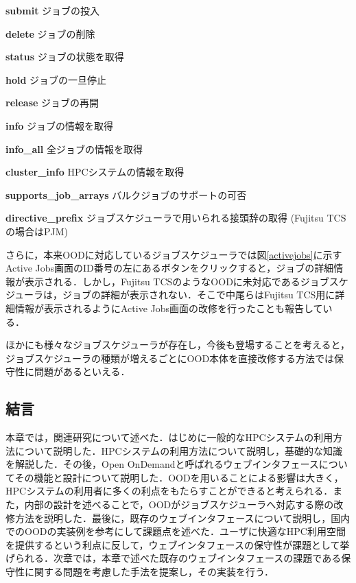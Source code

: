 \textbf{submit} ジョブの投入\par
\textbf{delete} ジョブの削除\par
\textbf{status} ジョブの状態を取得\par
\textbf{hold} ジョブの一旦停止\par
\textbf{release} ジョブの再開\par
\textbf{info} ジョブの情報を取得\par
\textbf{info\_all} 全ジョブの情報を取得\par
\textbf{cluster\_info} HPCシステムの情報を取得\par
\textbf{supports\_job\_arrays} バルクジョブのサポートの可否\par
\textbf{directive\_prefix} ジョブスケジューラで用いられる接頭辞の取得 (Fujitsu TCSの場合はPJM)\par

さらに，本来OODに対応しているジョブスケジューラでは図\ref{activejobs}に示すActive Jobs画面のID番号の左にあるボタンをクリックすると，ジョブの詳細情報が表示される．しかし，Fujitsu TCSのようなOODに未対応であるジョブスケジューラは，ジョブの詳細が表示されない．そこで中尾らはFujitsu TCS用に詳細情報が表示されるようにActive Jobs画面の改修を行ったことも報告している\cite{cite4}．\par
ほかにも様々なジョブスケジューラが存在し，今後も登場することを考えると，ジョブスケジューラの種類が増えるごとにOOD本体を直接改修する方法では保守性に問題があるといえる．\par


\subsection{結言}
本章では，関連研究について述べた．はじめに一般的なHPCシステムの利用方法について説明した．HPCシステムの利用方法について説明し，基礎的な知識を解説した．その後，Open OnDemandと呼ばれるウェブインタフェースについてその機能と設計について説明した．OODを用いることによる影響は大きく，HPCシステムの利用者に多くの利点をもたらすことができると考えられる．また，内部の設計を述べることで，OODがジョブスケジューラへ対応する際の改修方法を説明した．最後に，既存のウェブインタフェースについて説明し，国内でのOODの実装例を参考にして課題点を述べた．ユーザに快適なHPC利用空間を提供するという利点に反して，ウェブインタフェースの保守性が課題として挙げられる．次章では，本章で述べた既存のウェブインタフェースの課題である保守性に関する問題を考慮した手法を提案し，その実装を行う．\par